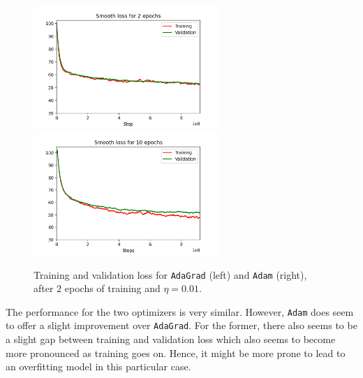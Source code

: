 \documentclass{article}
\begin{document}
	\begin{figure}[h!]
		\centering
		\includegraphics[width=7cm]{../plots/rnn_loss_v1.png}
		\includegraphics[width=7cm]{../plots/rnn_loss_v2.png}
		\caption{Training and validation loss for \texttt{AdaGrad} (left) and \texttt{Adam} (right), after $2$ epochs of training and $\eta = 0.01$.}
 	\end{figure}
	The performance for the two optimizers is very similar. However, \texttt{Adam} does seem to offer a slight improvement over \texttt{AdaGrad}. For the former, there also seems to be a slight gap between training and validation loss which also seems to become more pronounced as training goes on. Hence, it might be more prone to lead to an overfitting model in this particular case.
	
\newpage
\end{document}
